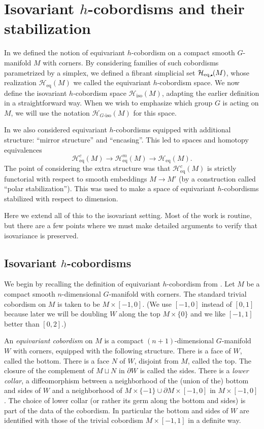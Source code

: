 \documentclass[11pt]{amsart}
\theoremstyle{definition}
\numberwithin{equation}{section}
\numberwithin{figure}{section}
\newcommand{\mc}{\mathcal}
\newcommand{\iso}{\mathrm{iso}}
\newcommand{\eq}{\mathrm{eq}}
\newcommand{\dashiso}{\textrm{-}\mathrm{iso}}
\newcommand{\sbt}{\,\begin{picture}(-1,1)(0.5,-1)\circle*{1.8}\end{picture}\hspace{.05cm}}
\newcommand{\ourdefn}[1]{{\it #1}}
\begin{document}
\section{Isovariant $h$-cobordisms and their stabilization}\label{sec:isovhcob}

In \cite{GIMM1} we defined the notion of equivariant $h$-cobordism on a compact smooth $G$-manifold $M$ with corners. By considering families of such cobordisms parametrized by a simplex, we defined a fibrant simplicial set $\mc H_{\eq,\sbt}(M)$, whose realization $\mc H_{\eq}(M)$ we called the equivariant $h$-cobordism space. We now define the isovariant $h$-cobordism space $\mc H_{\iso}(M)$, adapting the earlier definition in a straightforward way. When we wish to emphasize which group $G$ is acting on $M$, we will use the notation $\mc H_{G\dashiso}(M)$ for this space.


In \cite{GIMM1} we also considered equivariant $h$-cobordisms equipped with additional structure: ``mirror structure'' and ``encasing''. This led to spaces and homotopy equivalences 
$$
\mc H_{\eq}^c(M)\to \mc H_{\eq}^m(M)\to \mc H_{\eq}(M).
$$
The point of considering the extra structure was that $\mc H_{\eq}^c(M)$ is strictly functorial with respect to smooth embeddings $M\to M'$ (by a construction called ``polar stabilization''). This was used to make a space of equivariant $h$-cobordisms stabilized with respect to dimension. 

Here we extend all of this to the isovariant setting. Most of the work is routine, but there are a few points where we must make detailed arguments to verify that isovariance is preserved. %

\subsection{Isovariant $h$-cobordisms}\label{isovhcob}
We begin by recalling the definition of equivariant $h$-cobordism from \cite{GIMM1}. Let $M$ be a compact smooth $n$-dimensional $G$-manifold with corners. The standard trivial cobordism on $M$ is taken to be $M\times [-1,0]$. (We use $[-1,0]$ instead of $[0,1]$ because later we will be doubling $W$ along the top $M\times \{0\}$ and we like $[-1,1]$ better than $[0,2]$.)

An \ourdefn{equivariant cobordism} on $M$ is a compact $(n+1)$-dimensional $G$-manifold $W$ with corners, equipped with the following structure. There is a face of $W$, called the bottom. There is a face $N$ of $W$, disjoint from $M$, called the top. The closure of the complement of $M\sqcup N$ in $\partial W$ is called the sides. There is a \ourdefn{lower collar}, a diffeomorphism between a neighborhood of the (union of the) bottom and sides of $W$ and a neighborhood of $M\times \{-1\}\cup\partial M\times [-1,0]$ in $M\times [-1,0]$. The choice of lower collar (or rather its germ along the bottom and sides) is part of the data of the cobordism. In particular the bottom and sides of $W$ are identified with those of the trivial cobordism $M\times [-1,1]$ in a definite way.
\end{document}
